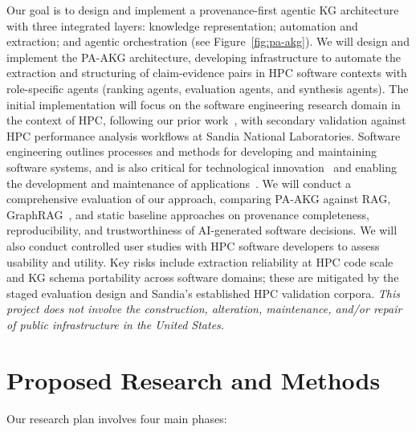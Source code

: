 \documentclass{files/proposalnsf}
\begin{document}
Our goal is to design and implement a provenance-first agentic KG architecture with three integrated layers: knowledge representation; automation and extraction; and agentic orchestration (see Figure~\ref{fig:pa-akg}). We will design and implement the PA-AKG architecture, developing infrastructure to automate the extraction and structuring of claim-evidence pairs in HPC software contexts with role-specific agents (\eg ranking agents, evaluation agents, and synthesis agents). The initial implementation will focus on the software engineering research domain in the context of HPC, following our prior work~\cite{cusati2026fose}, with secondary validation against HPC performance analysis workflows at Sandia National Laboratories. Software engineering outlines processes and methods for developing and maintaining software systems, and is also critical for technological innovation~\cite{vos2026reclaiming} and enabling the development and maintenance of applications~\cite{schmidberger2012need}. We will conduct a comprehensive evaluation of our approach, comparing PA-AKG against RAG, GraphRAG~\cite{Edge2024GraphRAG}, and static baseline approaches on provenance completeness, reproducibility, and trustworthiness of AI-generated software decisions. We will also conduct controlled user studies with HPC software developers to assess usability and utility. Key risks include extraction reliability at HPC code scale and KG schema portability across software domains; these are mitigated by the staged evaluation design and Sandia's established HPC validation corpora. \textit{This project does not involve the construction, alteration, maintenance, and/or repair of public infrastructure in the United States.}



\section{Proposed Research and Methods} 

Our research plan involves four main phases:
\end{document}
